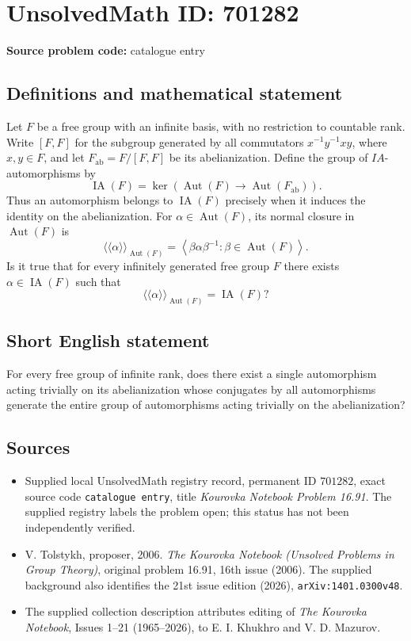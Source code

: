 \documentclass[11pt]{article}
\begin{document}
\section*{UnsolvedMath ID: 701282}
\textbf{Source problem code:} catalogue entry
\subsection{Definitions and mathematical statement}
Let \(F\) be a free group with an infinite basis, with no restriction to countable rank. Write \([F,F]\) for the subgroup generated by all commutators \(x^{-1}y^{-1}xy\), where \(x,y\in F\), and let \(F_{\mathrm{ab}}=F/[F,F]\) be its abelianization. Define the group of \(IA\)-automorphisms by
\[
\operatorname{IA}(F)=\ker\!\left(\operatorname{Aut}(F)\longrightarrow\operatorname{Aut}(F_{\mathrm{ab}})\right).
\]
Thus an automorphism belongs to \(\operatorname{IA}(F)\) precisely when it induces the identity on the abelianization. For \(\alpha\in\operatorname{Aut}(F)\), its normal closure in \(\operatorname{Aut}(F)\) is
\[
\langle\!\langle\alpha\rangle\!\rangle_{\operatorname{Aut}(F)}
=\left\langle\beta\alpha\beta^{-1}:\beta\in\operatorname{Aut}(F)\right\rangle.
\]
Is it true that for every infinitely generated free group \(F\) there exists \(\alpha\in\operatorname{IA}(F)\) such that
\[
\langle\!\langle\alpha\rangle\!\rangle_{\operatorname{Aut}(F)}=\operatorname{IA}(F)?
\]
\subsection{Short English statement}
For every free group of infinite rank, does there exist a single automorphism acting trivially on its abelianization whose conjugates by all automorphisms generate the entire group of automorphisms acting trivially on the abelianization?
\subsection{Sources}
\begin{itemize}
\item Supplied local UnsolvedMath registry record, permanent ID \(701282\), exact source code \texttt{catalogue entry}, title \emph{Kourovka Notebook Problem 16.91}. The supplied registry labels the problem open; this status has not been independently verified.
\item V. Tolstykh, proposer, 2006. \emph{The Kourovka Notebook (Unsolved Problems in Group Theory)}, original problem 16.91, 16th issue (2006). The supplied background also identifies the 21st issue edition (2026), \texttt{arXiv:1401.0300v48}.
\item The supplied collection description attributes editing of \emph{The Kourovka Notebook}, Issues 1--21 (1965--2026), to E. I. Khukhro and V. D. Mazurov.
\end{itemize}
\end{document}
